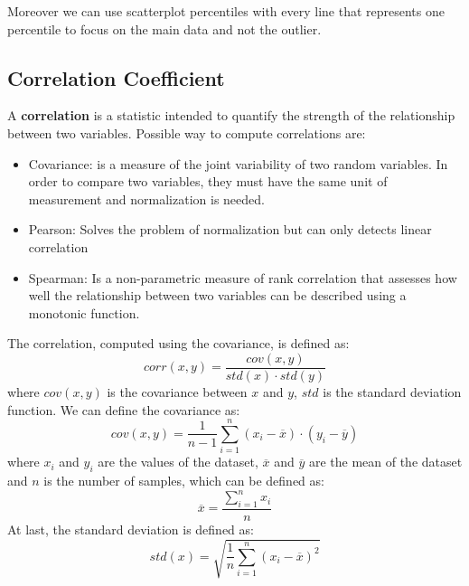 Moreover we can use scatterplot percentiles with every line that
represents one percentile to focus on the main data and not the
outlier.
\subsection{Correlation Coefficient}
A \textbf{correlation} is a statistic intended to quantify the
strength of the relationship between two variables. Possible way to
compute correlations are:
\begin{itemize}
  \item Covariance: is a measure of the joint variability of two
    random variables. In order to compare two variables, they must
    have the same unit of measurement and normalization is needed.
  \item Pearson: Solves the problem of normalization but can only
    detects linear correlation
  \item Spearman: Is a non-parametric measure of rank correlation
    that assesses how well the relationship between two variables
    can be described using a monotonic function.
\end{itemize}
The correlation, computed using the covariance, is defined as:
\begin{equation*}
  corr(x,y) = \dfrac{cov(x,y)}{std(x) \cdot std(y)}
\end{equation*}
where $cov(x,y)$ is the covariance between $x$ and $y$, $std$ is 
the standard deviation function.
We can define the covariance as:
\begin{equation*}
  cov(x,y) = \dfrac{1}{n-1} \sum_{i=1}^{n} (x_i - \overline{x}) \cdot
  (y_i - \overline{y})
\end{equation*}
where $x_i$ and $y_i$ are the values of the dataset, $\overline{x}$ 
and $\overline{y}$ are the mean of the dataset and $n$ is the number
of samples, which can be defined as:
\begin{equation*}
  \overline{x} = \dfrac{\sum_{i=1}^{n} x_i}{n}
\end{equation*}
At last, the standard deviation is defined as:
\begin{equation*}
  std(x) = \sqrt{\dfrac{1}{n} \sum_{i=1}^{n} (x_i - \overline{x})^2}
\end{equation*}



